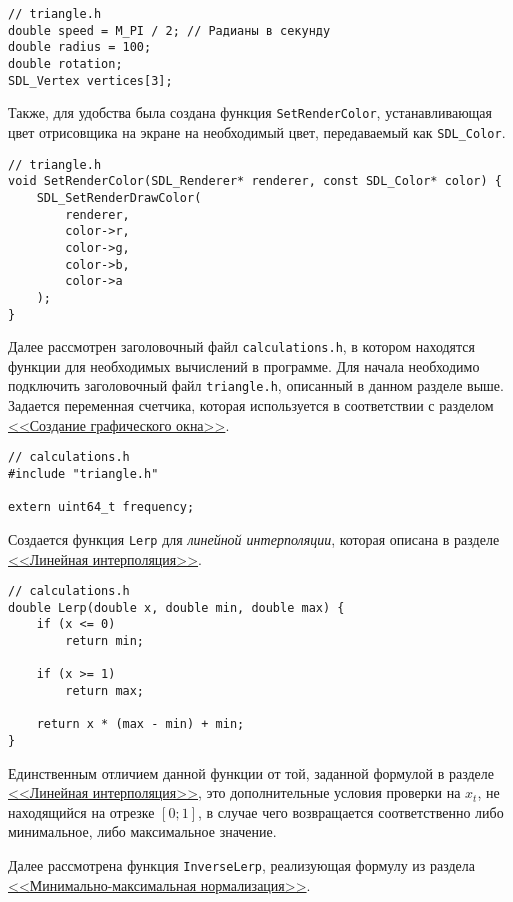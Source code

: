 \documentclass[14pt]{extarticle}
\begin{document}
{    \begin{lstlisting}
// triangle.h
double speed = M_PI / 2; // Радианы в секунду
double radius = 100;
double rotation;
SDL_Vertex vertices[3];\end{lstlisting}

    \label{sec:setcolor}
    \begin{spacing}{1.5}
        Также, для удобства была создана функция \verb|SetRenderColor|, устанавливающая цвет отрисовщика на экране на необходимый цвет, передаваемый как \verb|SDL_Color|. 
    \end{spacing}

    \begin{lstlisting}
// triangle.h
void SetRenderColor(SDL_Renderer* renderer, const SDL_Color* color) {
	SDL_SetRenderDrawColor(
		renderer,
		color->r,
		color->g,
		color->b,
		color->a
	);
}\end{lstlisting}

    \par
    
    \begin{spacing}{1.5}
        Далее рассмотрен заголовочный файл \verb|calculations.h|, в котором находятся функции для необходимых вычислений в программе. Для начала необходимо подключить заголовочный файл \verb|triangle.h|, описанный в данном разделе выше. Задается переменная счетчика, которая используется в соответствии с разделом \hyperref[sec:init]{<<Создание графического окна>>}.
    \end{spacing}

    \begin{lstlisting}
// calculations.h
#include "triangle.h"

extern uint64_t frequency;\end{lstlisting}

    \begin{spacing}{1.5}
        Создается функция \verb|Lerp| для \textit{линейной интерполяции}, которая описана в разделе \hyperref[sec:lerp]{<<Линейная интерполяция>>}.
    \end{spacing}

    \begin{lstlisting}
// calculations.h
double Lerp(double x, double min, double max) {
	if (x <= 0)
		return min;

	if (x >= 1)
		return max;

	return x * (max - min) + min;
}\end{lstlisting}

    \begin{spacing}{1.5}
        Единственным отличием данной функции от той, заданной формулой в разделе \hyperref[sec:lerp]{<<Линейная интерполяция>>}, это дополнительные условия проверки на $x_t$, не находящийся на отрезке $[0; 1]$, в случае чего возвращается соответственно либо минимальное, либо максимальное значение.
        \par
        Далее рассмотрена функция \verb|InverseLerp|, реализующая формулу из раздела \hyperref[sec:minmaxnorm]{<<Минимально-максимальная нормализация>>}.
    \end{spacing}


}
\end{document}
